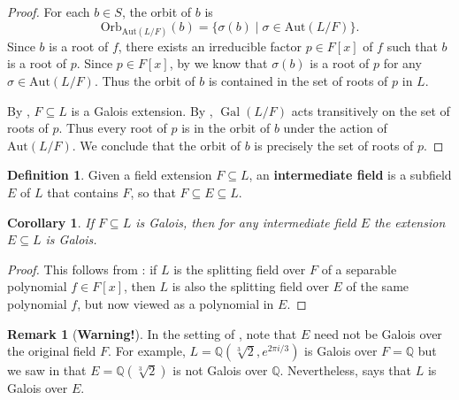 \documentclass[12pt]{report}
\newtheorem{corollary}[theorem]{Corollary}
\numberwithin{equation}{section}
\numberwithin{theorem}{chapter}
\theoremstyle{definition}
\newtheorem{definition}[theorem]{Definition}
\newtheorem*{basic properties}{Basic Properties}
\newtheorem*{Important Remark}{Important Remark}
\newtheorem{remark}[theorem]{Remark}
\newcommand{\df}[1]{{\bf #1}\index{#1}}
\DeclareMathOperator{\Gal}{Gal}
\begin{document}
\begin{proof}
For each $b \in S$, the orbit of $b$ is 
$$\mathrm{Orb}_{\mathrm{Aut}(L/F)}(b) = \{\sigma(b) \mid \sigma\in \mathrm{Aut}(L/F)\}.$$ 
Since $b$ is a root of $f$, there exists an irreducible factor $p \in F[x]$ of $f$ such that $b$ is a root of $p$. Since $p \in F[x]$, by  we know that $\sigma(b)$ is a root of $p$ for any $\sigma \in \mathrm{Aut}(L/F)$. Thus the orbit of $b$ is contained in the set of roots of $p$ in $L$.

By , $F \subseteq L$ is a Galois extension. By , $\Gal(L/F)$ acts transitively on the set of roots of $p$. Thus every root of $p$ is in the orbit of $b$ under the action of $\mathrm{Aut}(L/F)$. We conclude that the orbit of $b$ is precisely the set of roots of $p$.
\end{proof}




\begin{definition}
Given a field extension $F \subseteq L$, an \df{intermediate field} is a subfield $E$ of $L$ that contains $F$, so that $F \subseteq E
\subseteq L$.
\end{definition}

\begin{corollary}\label{galois extension intermediate also galois}
If $F \subseteq L$ is Galois, then for any intermediate field $E$ the extension $E \subseteq L$ is Galois.
\end{corollary}

\begin{proof} 
This follows from : if $L$ is the splitting field over $F$ of a separable polynomial $f \in F[x]$, then $L$ is also the splitting field over $E$ of the same polynomial $f$, but now viewed as a polynomial in $E$.
\end{proof}



\begin{remark}[\bf Warning!] 
In the setting of , note that $E$ need not be Galois over the original field $F$. For example, $L = \mathbb{Q}(\sqrt[3]{2}, e^{2 \pi i/3})$ is Galois over $F = \mathbb{Q}$ but we saw in  that $E = \mathbb{Q}(\sqrt[3]{2})$ is not Galois over $\mathbb{Q}$. Nevertheless,  says that $L$ is Galois over $E$.
\end{remark}
\end{document}
